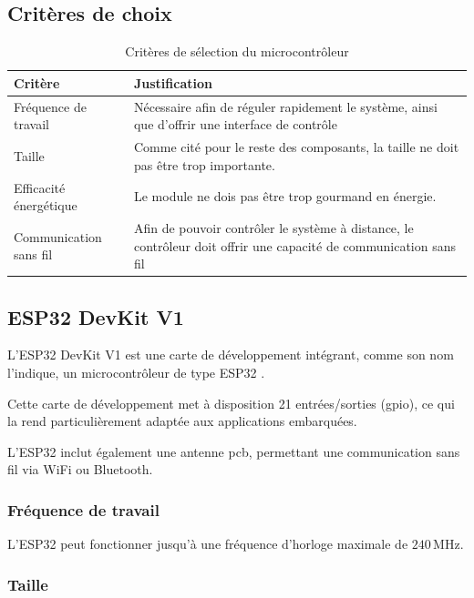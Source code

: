 \subsection{Critères de choix}
\begin{table}[H]
    \centering
    \begin{tabular}{|l|p{8cm}|}
        \hline
        \textbf{Critère} & \textbf{Justification} \\
        \hline
        Fréquence de travail & Nécessaire afin de réguler rapidement le système, ainsi que d'offrir une interface de contrôle \\
        \hline
        Taille & Comme cité pour le reste des composants, la taille ne doit pas être trop importante. \\
        \hline
        Efficacité énergétique & Le module ne dois pas être trop gourmand en énergie. \\
        \hline
        Communication sans fil & Afin de pouvoir contrôler le système à distance, le contrôleur doit offrir une capacité de communication sans fil \\
        \hline
    \end{tabular}
    \caption{Critères de sélection du microcontrôleur}
    \label{tab:criteres_microcontroleur}
\end{table}
\subsection{ESP32 DevKit V1}

L'ESP32 DevKit V1 \cite{ESP32-Devkit-V1} est une carte de développement intégrant, comme son nom l'indique, un microcontrôleur de type ESP32 \cite{ESP32_Series}. 

Cette carte de développement met à disposition 21 entrées/sorties (\acrshort{gpio}), ce qui la rend particulièrement adaptée aux applications embarquées.

L'ESP32 inclut également une antenne \acrshort{pcb}, permettant une communication sans fil via WiFi ou Bluetooth.

\subsubsection{Fréquence de travail}

L'ESP32 peut fonctionner jusqu'à une fréquence d'horloge maximale de $240\,\si{\mega\hertz}$.

\subsubsection{Taille}

